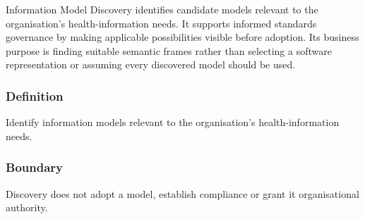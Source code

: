 Information Model Discovery identifies candidate models relevant to the organisation's health-information needs. It supports informed standards governance by making applicable possibilities visible before adoption. Its business purpose is finding suitable semantic frames rather than selecting a software representation or assuming every discovered model should be used.

\subsubsection*{Definition}

Identify information models relevant to the organisation’s health-information needs.

\subsubsection*{Boundary}

Discovery does not adopt a model, establish compliance or grant it organisational authority.


